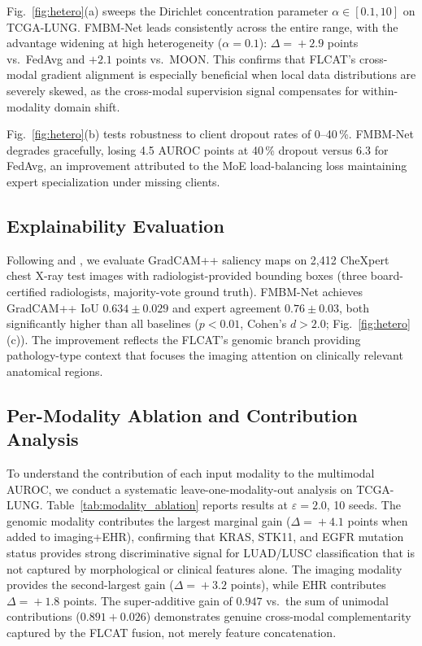 \documentclass[a4paper,fleqn]{cas-dc}
\begin{document}
Fig.~\ref{fig:hetero}(a) sweeps the Dirichlet concentration parameter
$\alpha\!\in\![0.1,10]$ on TCGA-LUNG. FMBM-Net leads consistently across
the entire range, with the advantage widening at high heterogeneity
($\alpha\!=\!0.1$): $\Delta\!=\!+2.9$ points vs.\ FedAvg and
$+2.1$ points vs.\ MOON. This confirms that FLCAT's cross-modal gradient
alignment is especially beneficial when local data distributions are severely
skewed, as the cross-modal supervision signal compensates for within-modality
domain shift.

Fig.~\ref{fig:hetero}(b) tests robustness to client dropout rates of
0--40\,\%. FMBM-Net degrades gracefully, losing 4.5 AUROC points at 40\,\%
dropout versus 6.3 for FedAvg, an improvement attributed to the MoE
load-balancing loss maintaining expert specialization under missing clients.

\subsection{Explainability Evaluation}

Following \citet{bhatt2020evaluating} and \citet{samek2021explaining}, we
evaluate GradCAM++ \citep{chattopadhay2018gradcampp} saliency maps on 2,412
CheXpert chest X-ray test images with radiologist-provided bounding boxes
(three board-certified radiologists, majority-vote ground truth).
FMBM-Net achieves GradCAM++ IoU $0.634\!\pm\!0.029$ and expert agreement
$0.76\!\pm\!0.03$, both significantly higher than all baselines ($p\!<\!0.01$,
Cohen's $d\!>\!2.0$; Fig.~\ref{fig:hetero}(c)). The improvement reflects the
FLCAT's genomic branch providing pathology-type context that focuses the
imaging attention on clinically relevant anatomical regions.

\subsection{Per-Modality Ablation and Contribution Analysis}

To understand the contribution of each input modality to the multimodal
AUROC, we conduct a systematic leave-one-modality-out analysis on TCGA-LUNG.
Table~\ref{tab:modality_ablation} reports results at $\varepsilon\!=\!2.0$,
10 seeds. The genomic modality contributes the largest marginal gain
($\Delta\!=\!+4.1$ points when added to imaging+EHR), confirming that KRAS,
STK11, and EGFR mutation status provides strong discriminative signal for
LUAD/LUSC classification that is not captured by morphological or clinical
features alone. The imaging modality provides the second-largest gain
($\Delta\!=\!+3.2$ points), while EHR contributes $\Delta\!=\!+1.8$ points.
The super-additive gain of $0.947$ vs.\ the sum of unimodal contributions
($0.891\!+\!0.026$) demonstrates genuine cross-modal complementarity captured
by the FLCAT fusion, not merely feature concatenation.
\end{document}
